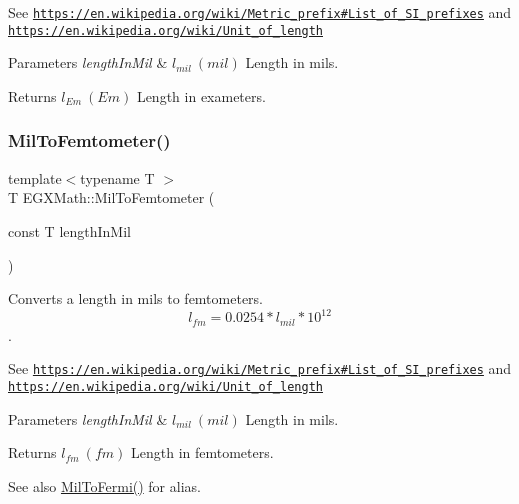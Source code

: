 See \href{https://en.wikipedia.org/wiki/Metric_prefix#List_of_SI_prefixes}{\tt https\+://en.\+wikipedia.\+org/wiki/\+Metric\+\_\+prefix\#\+List\+\_\+of\+\_\+\+S\+I\+\_\+prefixes} and \href{https://en.wikipedia.org/wiki/Unit_of_length}{\tt https\+://en.\+wikipedia.\+org/wiki/\+Unit\+\_\+of\+\_\+length} 
\begin{DoxyParams}{Parameters}
{\em length\+In\+Mil} & $ l_{mil}\ (mil)$ Length in mils. \\
\hline
\end{DoxyParams}
\begin{DoxyReturn}{Returns}
$ l_{Em}\ (Em)$ Length in exameters. 
\end{DoxyReturn}
\mbox{\label{group___e_g_x_math-_conversions-_length_conversions-_imperial-_mil-_s_i_gae66c2e7eb61fb3348c0b95a70088fff9}} 
\subsubsection{\texorpdfstring{Mil\+To\+Femtometer()}{MilToFemtometer()}}
{\footnotesize\ttfamily template$<$typename T $>$ \\
T E\+G\+X\+Math\+::\+Mil\+To\+Femtometer (\begin{DoxyParamCaption}\item[{const T}]{length\+In\+Mil }\end{DoxyParamCaption})}



Converts a length in mils to femtometers. \[ l_{fm}=0.0254* l_{mil} * 10^{12} \]. 

See \href{https://en.wikipedia.org/wiki/Metric_prefix#List_of_SI_prefixes}{\tt https\+://en.\+wikipedia.\+org/wiki/\+Metric\+\_\+prefix\#\+List\+\_\+of\+\_\+\+S\+I\+\_\+prefixes} and \href{https://en.wikipedia.org/wiki/Unit_of_length}{\tt https\+://en.\+wikipedia.\+org/wiki/\+Unit\+\_\+of\+\_\+length} 
\begin{DoxyParams}{Parameters}
{\em length\+In\+Mil} & $ l_{mil}\ (mil)$ Length in mils. \\
\hline
\end{DoxyParams}
\begin{DoxyReturn}{Returns}
$ l_{fm}\ (fm)$ Length in femtometers. 
\end{DoxyReturn}
\begin{DoxySeeAlso}{See also}
\mbox{\hyperlink{group___e_g_x_math-_conversions-_length_conversions-_imperial-_mil-_non-_s_i_ga713363db9840eea0ed836b1d47cc0b6c}{Mil\+To\+Fermi()}} for alias. 
\end{DoxySeeAlso}
\mbox{\label{group___e_g_x_math-_conversions-_length_conversions-_imperial-_mil-_s_i_ga283913ddb1b82447c2ff61ec5287a35f}} 
